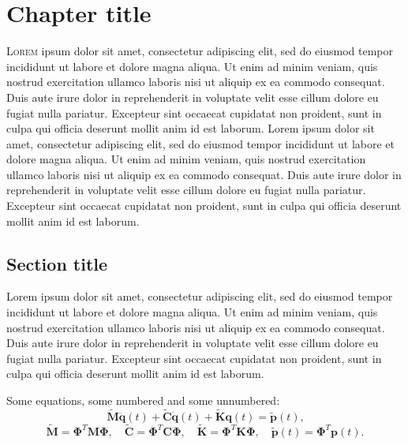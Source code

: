\chapter{Chapter title}
\lettrine[lines=3,slope=0pt,findent=-3pt]{L}{orem} ipsum dolor sit amet, consectetur adipiscing elit, sed do eiusmod tempor incididunt ut labore et dolore magna aliqua. Ut enim ad minim veniam, quis nostrud exercitation ullamco laboris nisi ut aliquip ex ea commodo consequat. Duis aute irure dolor in reprehenderit in voluptate velit esse cillum dolore eu fugiat nulla pariatur. Excepteur sint occaecat cupidatat non proident, sunt in culpa qui officia deserunt mollit anim id est laborum. Lorem ipsum dolor sit amet, consectetur adipiscing elit, sed do eiusmod tempor incididunt ut labore et dolore magna aliqua. Ut enim ad minim veniam, quis nostrud exercitation ullamco laboris nisi ut aliquip ex ea commodo consequat. Duis aute irure dolor in reprehenderit in voluptate velit esse cillum dolore eu fugiat nulla pariatur. Excepteur sint occaecat cupidatat non proident, sunt in culpa qui officia deserunt mollit anim id est laborum.


\section{Section title}
Lorem ipsum dolor sit amet, consectetur adipiscing elit, sed do eiusmod tempor incididunt ut labore et dolore magna aliqua. Ut enim ad minim veniam, quis nostrud exercitation ullamco laboris nisi ut aliquip ex ea commodo consequat. Duis aute irure dolor in reprehenderit in voluptate velit esse cillum dolore eu fugiat nulla pariatur. Excepteur sint occaecat cupidatat non proident, sunt in culpa qui officia deserunt mollit anim id est laborum.

Some equations, some numbered and some unnumbered:
\begin{equation}\label{eq:first}
\mathbf{\tilde{M}\ddot{q}}(t) + \mathbf{\tilde{C}\dot{q}}(t) + \mathbf{\tilde{K}q}(t) = \mathbf{\tilde{p}}(t) \text{,}
\end{equation}
\begin{equation}\label{eq:second}
\mathbf{\tilde{M}} = \bm{\Phi}^T\mathbf{M}\bm{\Phi}, \quad
  \mathbf{\tilde{C}} = \bm{\Phi}^T\mathbf{C}\bm{\Phi}, \quad
  \mathbf{\tilde{K}} = \bm{\Phi}^T\mathbf{K}\bm{\Phi}, \quad
  \mathbf{\tilde{p}}(t) = \bm{\Phi}^T\mathbf{p}(t).
\end{equation} 

